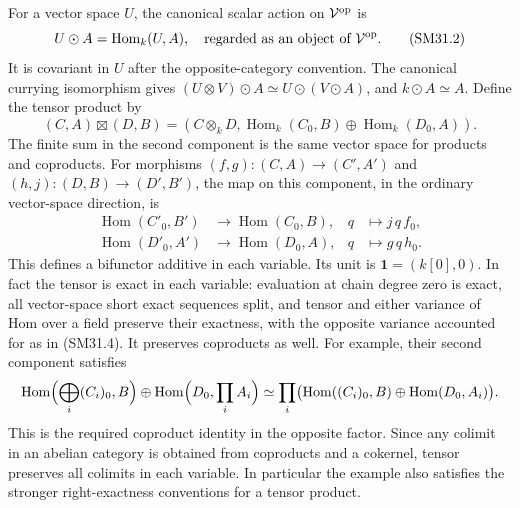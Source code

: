 For a vector space \(U\), the canonical scalar action on
\(\mathcal V^{\rm op}\) is
\[
             U\odot A=\operatorname{Hom}_k(U,A),
             \quad\text{regarded as an object of }\mathcal V^{\rm op}.
                                                               \tag{SM31.2}
\]
It is covariant in \(U\) after the opposite-category convention.
The canonical currying isomorphism gives
\((U\otimes V)\odot A\simeq U\odot(V\odot A)\),
and \(k\odot A\simeq A\).
Define the tensor product by
\[
 (C,A)\boxtimes(D,B)=
 \left(C\otimes_kD,
    \operatorname{Hom}_k(C_0,B)\oplus
    \operatorname{Hom}_k(D_0,A)\right).                    \tag{SM31.3}
\]
The finite sum in the second component is the same vector
space for products and coproducts.  For morphisms
\((f,g):(C,A)\to(C',A')\) and
\((h,j):(D,B)\to(D',B')\), the map on this component,
in the ordinary vector-space direction, is
\[
 \begin{aligned}
 \operatorname{Hom}(C'_0,B')&\longrightarrow\operatorname{Hom}(C_0,B),
                 &q&\longmapsto j\,q\,f_0,\\
 \operatorname{Hom}(D'_0,A')&\longrightarrow\operatorname{Hom}(D_0,A),
                 &q&\longmapsto g\,q\,h_0.
 \end{aligned}                                             \tag{SM31.4}
\]
This defines a bifunctor additive in each variable.
Its unit is \(\mathbf1=(k[0],0)\).
In fact the tensor is exact in each variable: evaluation at
chain degree zero is exact, all vector-space short exact
sequences split, and tensor and either variance of Hom over
a field preserve their exactness, with the opposite variance
accounted for as in (SM31.4).  It preserves coproducts as well.
For example, their second component satisfies
\[
 \operatorname{Hom}\Bigl(\bigoplus_i(C_i)_0,B\Bigr)
 \oplus\operatorname{Hom}\Bigl(D_0,\prod_iA_i\Bigr)
 \simeq\prod_i\bigl(\operatorname{Hom}((C_i)_0,B)
                 \oplus\operatorname{Hom}(D_0,A_i)\bigr).
\]
This is the required coproduct identity in the opposite
factor.  Since any colimit in an abelian category is obtained
from coproducts and a cokernel, tensor preserves all colimits
in each variable.  In particular the example also satisfies
the stronger right-exactness conventions for a tensor product.

